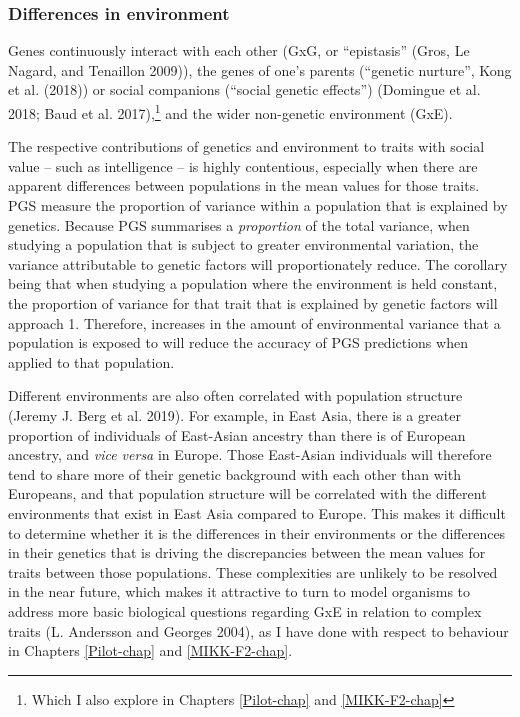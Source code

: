 \documentclass[
]{book}
\begin{document}
\hypertarget{fst-env-sec}{%
\subsubsection{Differences in environment}\label{fst-env-sec}}

Genes continuously interact with each other (GxG, or ``epistasis'' (Gros, Le Nagard, and Tenaillon 2009)), the genes of one's parents (``genetic nurture'', Kong et al. (2018)) or social companions (``social genetic effects'') (Domingue et al. 2018; Baud et al. 2017),\footnote{Which I also explore in Chapters \ref{Pilot-chap} and \ref{MIKK-F2-chap}} and the wider non-genetic environment (GxE).

The respective contributions of genetics and environment to traits with social value -- such as intelligence -- is highly contentious, especially when there are apparent differences between populations in the mean values for those traits. PGS measure the proportion of variance within a population that is explained by genetics. Because PGS summarises a \emph{proportion} of the total variance, when studying a population that is subject to greater environmental variation, the variance attributable to genetic factors will proportionately reduce. The corollary being that when studying a population where the environment is held constant, the proportion of variance for that trait that is explained by genetic factors will approach 1. Therefore, increases in the amount of environmental variance that a population is exposed to will reduce the accuracy of PGS predictions when applied to that population.

Different environments are also often correlated with population structure (Jeremy J. Berg et al. 2019). For example, in East Asia, there is a greater proportion of individuals of East-Asian ancestry than there is of European ancestry, and \emph{vice versa} in Europe. Those East-Asian individuals will therefore tend to share more of their genetic background with each other than with Europeans, and that population structure will be correlated with the different environments that exist in East Asia compared to Europe. This makes it difficult to determine whether it is the differences in their environments or the differences in their genetics that is driving the discrepancies between the mean values for traits between those populations. These complexities are unlikely to be resolved in the near future, which makes it attractive to turn to model organisms to address more basic biological questions regarding GxE in relation to complex traits (L. Andersson and Georges 2004), as I have done with respect to behaviour in Chapters \ref{Pilot-chap} and \ref{MIKK-F2-chap}.
\end{document}
